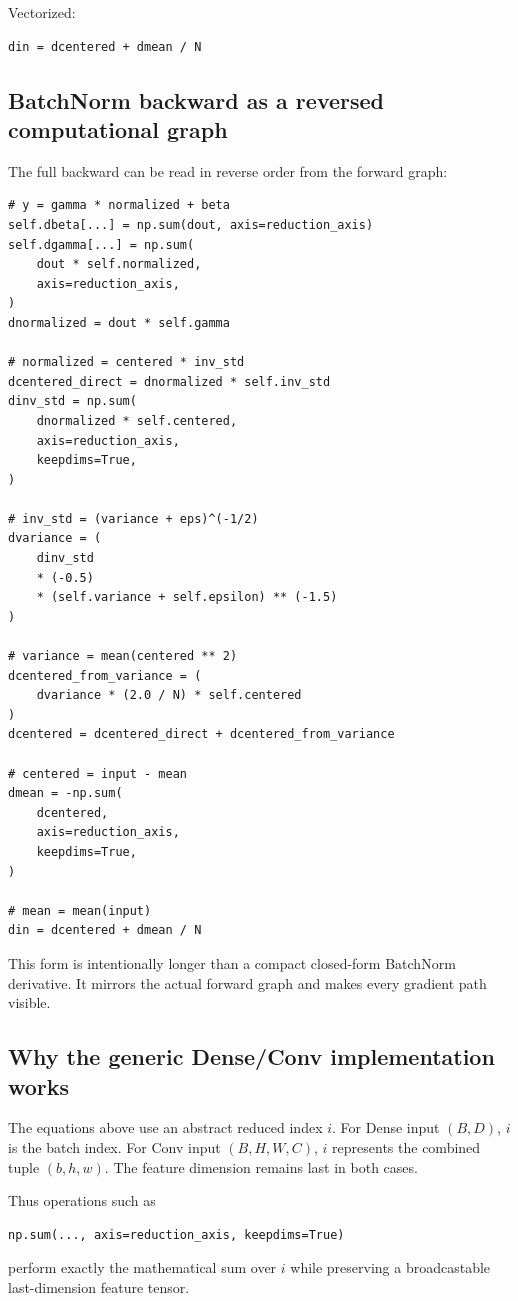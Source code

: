 \documentclass[11pt,a4paper]{article}
\begin{document}
Vectorized:
\begin{lstlisting}
din = dcentered + dmean / N
\end{lstlisting}

\subsection{BatchNorm backward as a reversed computational graph}

The full backward can be read in reverse order from the forward graph:
\begin{lstlisting}
# y = gamma * normalized + beta
self.dbeta[...] = np.sum(dout, axis=reduction_axis)
self.dgamma[...] = np.sum(
    dout * self.normalized,
    axis=reduction_axis,
)
dnormalized = dout * self.gamma

# normalized = centered * inv_std
dcentered_direct = dnormalized * self.inv_std
dinv_std = np.sum(
    dnormalized * self.centered,
    axis=reduction_axis,
    keepdims=True,
)

# inv_std = (variance + eps)^(-1/2)
dvariance = (
    dinv_std
    * (-0.5)
    * (self.variance + self.epsilon) ** (-1.5)
)

# variance = mean(centered ** 2)
dcentered_from_variance = (
    dvariance * (2.0 / N) * self.centered
)
dcentered = dcentered_direct + dcentered_from_variance

# centered = input - mean
dmean = -np.sum(
    dcentered,
    axis=reduction_axis,
    keepdims=True,
)

# mean = mean(input)
din = dcentered + dmean / N
\end{lstlisting}

This form is intentionally longer than a compact closed-form BatchNorm derivative. It mirrors the actual forward graph and makes every gradient path visible.

\subsection{Why the generic Dense/Conv implementation works}

The equations above use an abstract reduced index $i$. For Dense input $(B,D)$, $i$ is the batch index. For Conv input $(B,H,W,C)$, $i$ represents the combined tuple $(b,h,w)$. The feature dimension remains last in both cases.

Thus operations such as
\begin{lstlisting}
np.sum(..., axis=reduction_axis, keepdims=True)
\end{lstlisting}
perform exactly the mathematical sum over $i$ while preserving a broadcastable last-dimension feature tensor.
\end{document}
